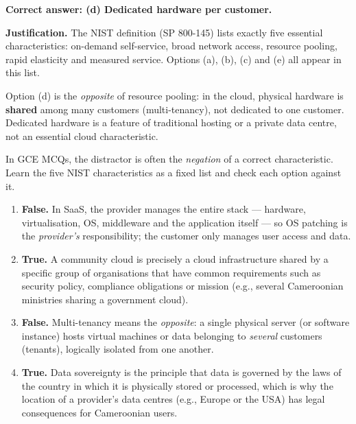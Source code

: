 \documentclass[11pt]{article}
\newcommand{\cle}[1]{{\popxbold\color{popdark}#1}}
\begin{document}
\begin{corrige}
\textbf{Correct answer: (d) Dedicated hardware per customer.}

\textbf{Justification.} The NIST definition (SP 800-145) lists exactly five essential characteristics: \cle{on-demand self-service}, \cle{broad network access}, \cle{resource pooling}, \cle{rapid elasticity} and \cle{measured service}. Options (a), (b), (c) and (e) all appear in this list.

Option (d) is the \emph{opposite} of resource pooling: in the cloud, physical hardware is \textbf{shared} among many customers (multi-tenancy), not dedicated to one customer. Dedicated hardware is a feature of traditional hosting or a private data centre, not an essential cloud characteristic.

\begin{attention}
In GCE MCQs, the distractor is often the \emph{negation} of a correct characteristic. Learn the five NIST characteristics as a fixed list and check each option against it.
\end{attention}
\end{corrige}

\begin{corrige}
\begin{enumerate}
\item \textbf{False.} In SaaS, the provider manages the entire stack — hardware, virtualisation, OS, middleware and the application itself — so OS patching is the \emph{provider's} responsibility; the customer only manages user access and data.
\item \textbf{True.} A community cloud is precisely a cloud infrastructure shared by a specific group of organisations that have common requirements such as security policy, compliance obligations or mission (e.g., several Cameroonian ministries sharing a government cloud).
\item \textbf{False.} Multi-tenancy means the \emph{opposite}: a single physical server (or software instance) hosts virtual machines or data belonging to \emph{several} customers (tenants), logically isolated from one another.
\item \textbf{True.} Data sovereignty is the principle that data is governed by the laws of the country in which it is physically stored or processed, which is why the location of a provider's data centres (e.g., Europe or the USA) has legal consequences for Cameroonian users.
\end{enumerate}
\end{corrige}
\end{document}

